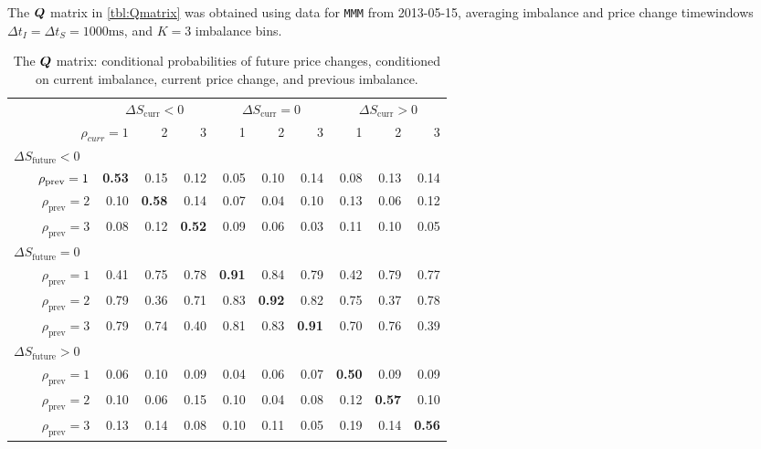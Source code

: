 The $\boldsymbol{Q}$ matrix in \autoref{tbl:Qmatrix} was obtained using data for \texttt{MMM} from 2013-05-15, averaging imbalance and price change timewindows $\Delta t_I = \Delta t_S = 1000\text{ms}$, and $K=3$ imbalance bins.
\begin{table}[hb]%
\centering%
%
\caption[Probabilities of future price changes]{The $\boldsymbol{Q}$ matrix: conditional probabilities of future price changes, conditioned on current imbalance, current price change, and previous imbalance.}\label{tbl:Qmatrix}%
\begin{tabular}{@{} r@{\hskip 1cm} *{9}{r} @{}}%
\toprule
& \multicolumn{3}{c}{$\Delta S_\text{curr} < 0$} & \multicolumn{3}{c}{$\Delta S_\text{curr} = 0$} & \multicolumn{3}{c}{$\Delta S_\text{curr} > 0$} \\
\cmidrule(lr){2-4} \cmidrule(lr){5-7} \cmidrule(lr){8-10}
\multicolumn{2}{r}{$\rho_{curr} = 1$} & 2 & 3 & 1 & 2 & 3 & 1 & 2 & 3 \\
\midrule
\multicolumn{10}{l}{$\Delta S_\text{future} < 0$} \\
$\hphantom{abcd}\rho_\text{prev} = 1$ & \bf 0.53 & 0.15 & 0.12 & 0.05 & 0.10 & 0.14 & 0.08 & 0.13 & 0.14 \\
$\rho_\text{prev} = 2$ & 0.10 & \bf 0.58 & 0.14 & 0.07 & 0.04 & 0.10 & 0.13 & 0.06 & 0.12 \\
$\rho_\text{prev} = 3$ & 0.08 & 0.12 & \bf 0.52 & 0.09 & 0.06 & 0.03 & 0.11 & 0.10 & 0.05 \\[0.6ex]
\multicolumn{10}{l}{$\Delta S_\text{future} = 0$} \\
$\rho_\text{prev} = 1$ & 0.41 & 0.75 & 0.78 & \bf 0.91 & 0.84 & 0.79 & 0.42 & 0.79 & 0.77 \\
$\rho_\text{prev} = 2$ & 0.79 & 0.36 & 0.71 & 0.83 & \bf 0.92 & 0.82 & 0.75 & 0.37 & 0.78 \\
$\rho_\text{prev} = 3$ & 0.79 & 0.74 & 0.40 & 0.81 & 0.83 & \bf 0.91 & 0.70 & 0.76 & 0.39 \\[0.6ex]
\multicolumn{10}{l}{$\Delta S_\text{future} > 0$} \\
$\rho_\text{prev} = 1$ & 0.06 & 0.10 & 0.09 & 0.04 & 0.06 & 0.07 & \bf 0.50 & 0.09 & 0.09 \\
$\rho_\text{prev} = 2$ & 0.10 & 0.06 & 0.15 & 0.10 & 0.04 & 0.08 & 0.12 & \bf 0.57 & 0.10 \\
$\rho_\text{prev} = 3$ & 0.13 & 0.14 & 0.08 & 0.10 & 0.11 & 0.05 & 0.19 & 0.14 & \bf 0.56 \\
\bottomrule
\end{tabular}%
\end{table}%


